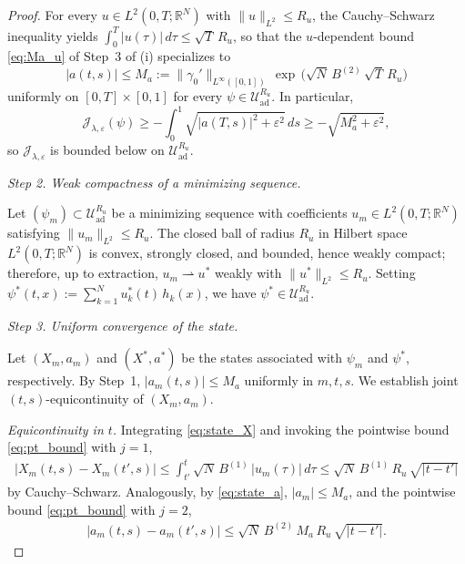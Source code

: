 \documentclass[12pt, reqno]{amsart}
\theoremstyle{plain}
\theoremstyle{definition}
\numberwithin{equation}{section}
\numberwithin{figure}{section}
\numberwithin{algorithm}{section}
\begin{document}
\begin{proof}
For every $u\in L^2(0,T;\mathbb R^N)$ with $\|u\|_{L^2}\le R_u$, the Cauchy--Schwarz inequality yields $\int_0^T|u(\tau)|\,d\tau\le\sqrt T\,R_u$, so that the $u$-dependent bound \eqref{eq:Ma_u} of Step~3 of (i) specializes to
\begin{equation}\label{eq:Ma}
|a(t,s)|\le M_a:=\|\gamma_0'\|_{L^\infty([0,1])}\,\exp\,\bigl(\sqrt N\,B^{(2)}\,\sqrt T\,R_u\bigr)
\end{equation}
uniformly on $[0,T]\times[0,1]$ for every $\psi\in\mathcal U_{\mathrm{ad}}^{R_u}$. In particular,
\begin{equation*}
\mathcal J_{\lambda,\varepsilon}(\psi)\ge-\int_0^1\sqrt{|a(T,s)|^2+\varepsilon^2}\,ds\ge-\sqrt{M_a^2+\varepsilon^2},
\end{equation*}
so $\mathcal J_{\lambda,\varepsilon}$ is bounded below on $\mathcal U_{\mathrm{ad}}^{R_u}$.

\vskip 5pt
\noindent\textit{Step 2. Weak compactness of a minimizing sequence.}

Let $(\psi_m)\subset\mathcal U_{\mathrm{ad}}^{R_u}$ be a minimizing sequence with coefficients $u_m\in L^2(0,T;\mathbb R^N)$ satisfying $\|u_m\|_{L^2}\le R_u$. The closed ball of radius $R_u$ in Hilbert space $L^2(0,T;\mathbb R^N)$ is convex, strongly closed, and bounded, hence weakly compact; therefore, up to extraction, $u_m\rightharpoonup u^*$ weakly with $\|u^*\|_{L^2}\le R_u$. Setting $\psi^*(t,x):=\sum_{k=1}^N u^*_k(t)\,h_k(x)$, we have $\psi^*\in\mathcal U_{\mathrm{ad}}^{R_u}$.

\vskip 5pt
\noindent\textit{Step 3. Uniform convergence of the state.}

Let $(X_m,a_m)$ and $(X^*,a^*)$ be the states associated with $\psi_m$ and $\psi^*$, respectively. By Step~1, $|a_m(t,s)|\le M_a$ uniformly in $m,t,s$. We establish joint $(t,s)$-equicontinuity of $(X_m,a_m)$.

\emph{Equicontinuity in $t$.} Integrating \eqref{eq:state_X} and invoking the pointwise bound \eqref{eq:pt_bound} with $j=1$,
\begin{align*}
|X_m(t,s)-X_m(t',s)|
\le\int_{t'}^t\sqrt N\,B^{(1)}\,|u_m(\tau)|\,d\tau
\le\sqrt N\,B^{(1)}\,R_u\,\sqrt{|t-t'|}
\end{align*}
by Cauchy--Schwarz. Analogously, by \eqref{eq:state_a}, $|a_m|\le M_a$, and the pointwise bound \eqref{eq:pt_bound} with $j=2$,
\begin{align*}
|a_m(t,s)-a_m(t',s)|\le\sqrt N\,B^{(2)}\,M_a\,R_u\,\sqrt{|t-t'|}.
\end{align*}


\end{proof}
\end{document}
